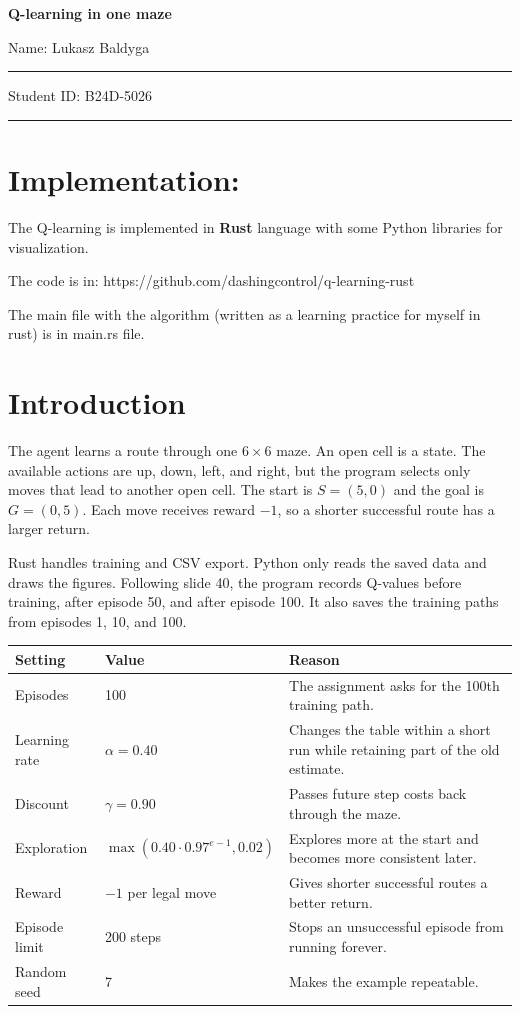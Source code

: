 \documentclass[10pt,a4paper]{article}
\begin{document}
\begin{center}
  {\LARGE\bfseries Q-learning in one maze\par}
  \vspace{5pt}
  {\normalsize Name: Lukasz Baldyga \rule{34mm}{0.4pt}\hfill
  Student ID: B24D-5026 \rule{24mm}{0.4pt}\par}
\end{center}

\section{Implementation:}

The Q-learning is implemented in \textbf{Rust} language with some Python libraries for visualization.

The code is in: https://github.com/dashingcontrol/q-learning-rust

The main file with the algorithm (written as a learning practice for myself in rust) is in main.rs file.

\section{Introduction}

The agent learns a route through one $6\times6$ maze. An open cell is a state. The available actions are up,
down, left, and right, but the program selects only moves that lead to another open cell. The start is
$S=(5,0)$ and the goal is $G=(0,5)$. Each move receives reward $-1$, so a shorter successful route has a
larger return.

Rust handles training and CSV export. Python only reads the saved data and draws the figures. Following slide
40, the program records Q-values before training, after episode 50, and after episode 100. It also saves the
training paths from episodes 1, 10, and 100.

\begin{center}
\footnotesize
\begin{tabularx}{0.96\textwidth}{@{}p{}p{}Y@{}}
  \toprule
  \textbf{Setting} & \textbf{Value} & \textbf{Reason} \\
  \midrule
  Episodes & 100 & The assignment asks for the 100th training path. \\
  Learning rate & $\alpha=0.40$ & Changes the table within a short run while retaining part of the old estimate. \\
  Discount & $\gamma=0.90$ & Passes future step costs back through the maze. \\
  Exploration & $\max(0.40\cdot0.97^{e-1},0.02)$ & Explores more at the start and becomes more consistent later. \\
  Reward & $-1$ per legal move & Gives shorter successful routes a better return. \\
  Episode limit & 200 steps & Stops an unsuccessful episode from running forever. \\
  Random seed & 7 & Makes the example repeatable. \\
  \bottomrule
\end{tabularx}
\end{center}
\end{document}
